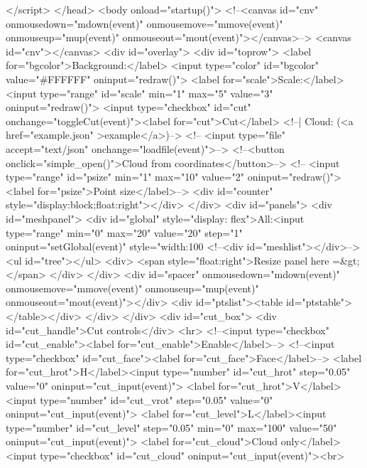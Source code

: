         </script>
    </head>
    <body onload="startup()">
        <!--<canvas id="cnv" onmousedown="mdown(event)" onmousemove="mmove(event)" onmouseup="mup(event)" onmouseout="mout(event)"></canvas>-->
        <canvas id="cnv"></canvas>
        <div id="overlay">
            <div id="toprow">
                <label for="bgcolor">Background:</label>
                <input type="color" id="bgcolor" value="#FFFFFF" oninput="redraw()">
                <label for="scale">Scale:</label><input type="range" id="scale" min="1" max="5" value="3" oninput="redraw()">
                <input type="checkbox" id="cut" onchange="toggleCut(event)"><label for="cut">Cut</label>
                <!--| Cloud: (<a href="example.json"  >example</a>)-->
               <!-- <input type="file" accept="text/json" onchange="loadfile(event)">-->
                <!--<button onclick="simple_open()">Cloud from coordinates</button>-->
               <!-- <input type="range" id="psize" min="1" max="10" value="2" oninput="redraw()"><label for="psize">Point size</label>-->
                <div id="counter" style="display:block;float:right"></div>
            </div>
            <div id="panels">
                <div id="meshpanel">
                    <div id="global" style="display: flex">All:<input type="range" min="0" max="20" value="20" step="1" oninput="setGlobal(event)" style="width:100%
                    <!--<div id="meshlist"></div>-->
                    <ul id="tree"></ul>
                    <div>
                        <span style="float:right">Resize panel here =&gt;</span>
                    </div>
                </div>
                <div id="spacer" onmousedown="mdown(event)" onmousemove="mmove(event)" onmouseup="mup(event)" onmouseout="mout(event)"></div>
                <div id="ptslist"><table id="ptstable"></table></div>
            </div>
        </div>
        <div id="cut_box">
            <div id="cut_handle">Cut controls</div>
            <hr>
            <!--<input type="checkbox" id="cut_enable"><label for="cut_enable">Enable</label>-->
            <!--<input type="checkbox" id="cut_face"><label for="cut_face">Face</label>-->
            <label for="cut_hrot">H</label><input type="number" id="cut_hrot" step="0.05" value="0" oninput="cut_input(event)">
            <label for="cut_hrot">V</label><input type="number" id="cut_vrot" step="0.05" value="0" oninput="cut_input(event)">
            <label for="cut_level">L</label><input type="number" id="cut_level" step="0.05" min="0" max="100" value="50" oninput="cut_input(event)">
            <label for="cut_cloud">Cloud only</label><input type="checkbox" id="cut_cloud" oninput="cut_input(event)"><br>
